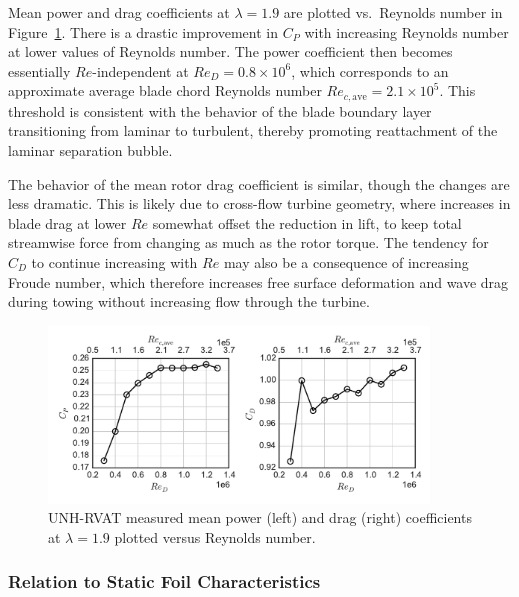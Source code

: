 \documentclass[energies,article,accept,moreauthors,pdftex,12pt,a4paper]{mdpi}
\begin{document}
Mean power and drag coefficients at $\lambda=1.9$ are plotted vs.\ Reynolds
number in Figure~\ref{fig:perf-Re-dep}. There is a drastic improvement in $C_P$
with increasing Reynolds number at lower values of Reynolds number. The power
coefficient then becomes  essentially $Re$-independent at $Re_D = 0.8 \times
10^6$, which corresponds to an approximate average blade chord Reynolds number
$Re_{c, \mathrm{ave}} = 2.1 \times 10^5$. This threshold is consistent with the
behavior of the blade boundary layer transitioning from laminar to turbulent,
thereby promoting reattachment of the laminar separation bubble.

The behavior of the mean rotor drag coefficient is similar, though the changes
are less dramatic. This is likely due to cross-flow turbine geometry, where
increases in blade drag at lower $Re$ somewhat offset the reduction in lift, to
keep total streamwise force from changing as much as the rotor torque. The
tendency for $C_D$ to continue increasing with $Re$ may also be a consequence of
increasing Froude number, which therefore increases free surface deformation and
wave drag during towing without increasing flow through the turbine.

\begin{figure}[ht]
\centering

\includegraphics[width=0.9\textwidth]{figures/perf_re_dep}

\caption{UNH-RVAT measured mean power (left) and drag (right) coefficients at
    $\lambda=1.9$ plotted versus Reynolds number.}

\label{fig:perf-Re-dep}
\end{figure}

\subsubsection{Relation to Static Foil Characteristics}
\end{document}
